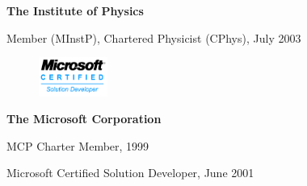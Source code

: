 \documentclass[10pt]{article}
\newenvironment{innerlist}[1][\enskip\textbullet]%
        {\begin{compactitem}[#1]}{\end{compactitem}}
\newcommand{\blankline}{\quad\pagebreak[2]}
\begin{document}
\textbf{The Institute of Physics}
\begin{innerlist}
\item Member (MInstP), Chartered Physicist (CPhys), July 2003
\end{innerlist}


\begin{figure}     \includegraphics[width=0.2\textwidth]{MCSD_logo}\end{figure}

\textbf{The Microsoft Corporation}
\begin{innerlist}
\item MCP Charter Member, 1999
\item Microsoft Certified Solution Developer, June 2001
%
\end{innerlist}


%
\end{document}
